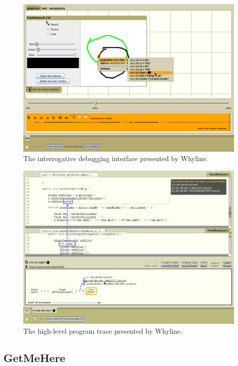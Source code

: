 \begin{figure}[ht]
\centering
\includegraphics[width=\textwidth]{./figs/whyline-question-interface.png}
\caption{The interrogative debugging interface presented by Whyline.}
\label{fig:WhylineQuestion}
\end{figure}

\begin{figure}[ht]
\centering
\includegraphics[width=\textwidth]{./figs/whyline-trace-back.png}
\caption{The high-level program trace presented by Whyline.}
\label{fig:WhylineTrace}
\end{figure}

\subsection{GetMeHere}
\label{subsec:GetMeHere}

